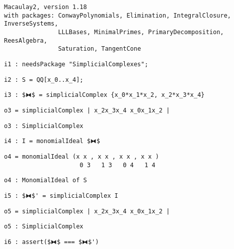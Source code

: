 \documentclass[12pt,leqno]{amsart}
\theoremstyle{definition}
\begin{document}
\begin{lstlisting}[xleftmargin=10pt, lineskip=-5pt, aboveskip=3.0pt, belowskip=1.5pt]
Macaulay2, version 1.18
with packages: ConwayPolynomials, Elimination, IntegralClosure, InverseSystems, 
               LLLBases, MinimalPrimes, PrimaryDecomposition, ReesAlgebra, 
               Saturation, TangentCone
\end{lstlisting}
\begin{lstlisting}[xleftmargin=10pt, aboveskip=1.5pt, belowskip=1.5pt]
i1 : needsPackage "SimplicialComplexes";
\end{lstlisting}
\begin{lstlisting}[xleftmargin=10pt, aboveskip=1.5pt, belowskip=1.5pt]
i2 : S = QQ[x_0..x_4];
\end{lstlisting}
\begin{lstlisting}[xleftmargin=10pt, aboveskip=1.5pt, belowskip=1.5pt]
i3 : $⧓$ = simplicialComplex {x_0*x_1*x_2, x_2*x_3*x_4}
\end{lstlisting}
\begin{lstlisting}[xleftmargin=10pt, aboveskip=1.5pt, belowskip=1.5pt]
o3 = simplicialComplex | x_2x_3x_4 x_0x_1x_2 |
\end{lstlisting}
\begin{lstlisting}[xleftmargin=10pt, aboveskip=1.5pt, belowskip=1.5pt]
o3 : SimplicialComplex
\end{lstlisting}
\begin{lstlisting}[xleftmargin=10pt, aboveskip=1.5pt, belowskip=1.5pt]
i4 : I = monomialIdeal $⧓$
\end{lstlisting}
\begin{lstlisting}[xleftmargin=10pt, lineskip=-10pt, aboveskip=4pt, belowskip=1.5pt]
o4 = monomialIdeal (x x , x x , x x , x x )
                     0 3   1 3   0 4   1 4
\end{lstlisting}
\begin{lstlisting}[xleftmargin=10pt, aboveskip=1.5pt, belowskip=1.5pt]
o4 : MonomialIdeal of S
\end{lstlisting}
\begin{lstlisting}[xleftmargin=10pt, aboveskip=1.5pt, belowskip=1.5pt]
i5 : $⧓$' = simplicialComplex I
\end{lstlisting}
\begin{lstlisting}[xleftmargin=10pt, aboveskip=1.5pt, belowskip=1.5pt]
o5 = simplicialComplex | x_2x_3x_4 x_0x_1x_2 |
\end{lstlisting}
\begin{lstlisting}[xleftmargin=10pt, aboveskip=1.5pt, belowskip=1.5pt]
o5 : SimplicialComplex
\end{lstlisting}
\begin{lstlisting}[xleftmargin=10pt, aboveskip=1.5pt, belowskip=3.0pt]
i6 : assert($⧓$ === $⧓$')
\end{lstlisting}
\end{document}
